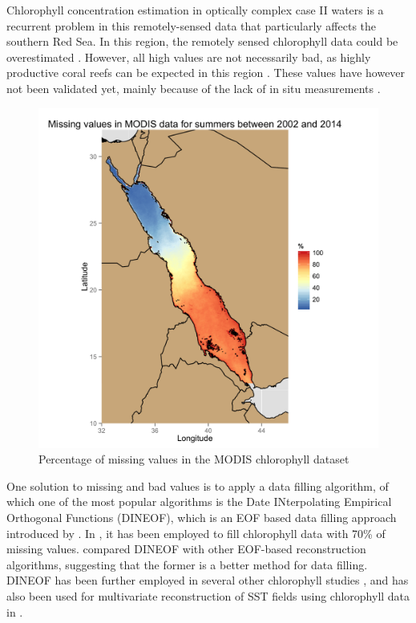Chlorophyll concentration estimation in optically complex case II waters is a
recurrent problem in this remotely-sensed data that particularly affects the
southern Red Sea.  In this region, the remotely sensed chlorophyll data could
be overestimated \citep{Raitsos2013}. However, all high values are not
necessarily bad, as highly productive coral reefs can be expected in this
region \citep{Raitsos2013}. These values have however not been validated yet,
mainly because of the lack of in situ measurements \citep{Raitsos2013}.

\begin{figure}[h]
    \centering
    \includegraphics[scale=.15]{figures/modis_missing_values_summer.png}
    \caption{Percentage of missing values in the MODIS chlorophyll dataset}
    \label{misval_modis}
\end{figure}

One solution to missing and bad values is to apply a data filling algorithm, of
which one of the most popular algorithms is the Date INterpolating Empirical
Orthogonal Functions (DINEOF), which is an EOF based data filling approach
introduced by \citet{Beckers2003}. In \citet{Sicarjobs2011}, it has been
employed to fill chlorophyll data with 70\% of missing values.
\citet{Taylor2013} compared DINEOF with other EOF-based reconstruction
algorithms, suggesting that the former is a better method for data filling.
DINEOF has been further employed in several other chlorophyll studies
\citep{Miles2010, Waite2013}, and has also been used for multivariate
reconstruction of SST fields using chlorophyll data in \citet{Alvera2007}. 

